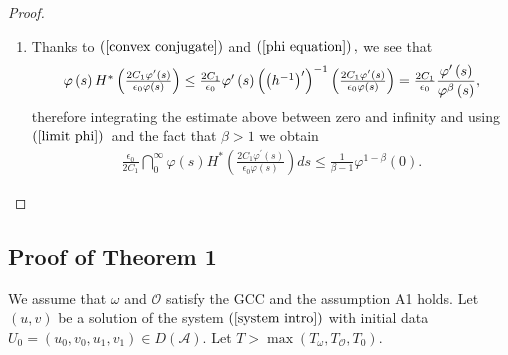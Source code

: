 \documentclass[11pt,reqno]{amsart}
\theoremstyle{plain}
\numberwithin{equation}{section}
\numberwithin{equation}{section}
\begin{document}
\begin{proof}
\begin{enumerate}
\item Thanks to $\left( \ref{convex conjugate}\right) $ and $\left( \ref{phi
equation}\right) ,$ we see that%
\begin{equation*}
\begin{array}{c}
\varphi \left( s\right) H^{\ast }\left( \frac{2C_{1}\varphi ^{\prime }\left(
s\right) }{\epsilon _{0}\varphi \left( s\right) }\right) \leq \frac{2C_{1}}{%
\epsilon _{0}}\varphi ^{\prime }\left( s\right) \left( \left( h^{-1}\right)
^{\prime }\right) ^{-1}\left( \frac{2C_{1}\varphi ^{\prime }\left( s\right) 
}{\epsilon _{0}\varphi \left( s\right) }\right) =\frac{2C_{1}}{\epsilon _{0}}%
\dfrac{\varphi ^{\prime }\left( s\right) }{\varphi ^{\beta }\left( s\right) }%
,%
\end{array}%
\end{equation*}%
therefore integrating the estimate above between zero and infinity and using 
$\left( \ref{limit phi}\right) $\ and the fact that $\beta >1$ we obtain 
\begin{equation*}
\begin{array}{c}
\frac{\epsilon _{0}}{2C_{1}}\dint_{0}^{\infty }\varphi \left( s\right)
H^{\ast }\left( \frac{2C_{1}\varphi ^{\prime }\left( s\right) }{\epsilon
_{0}\varphi \left( s\right) }\right) ds\leq \frac{1}{\beta -1}\varphi
^{1-\beta }\left( 0\right) .%
\end{array}%
\end{equation*}
\end{enumerate}
\end{proof}

\subsection{Proof of Theorem 1}

We assume that $\omega $ and $\mathcal{O}$ satisfy the GCC and the
assumption A1 holds$.$ Let $\left( u,v\right) $ be a solution of the system $%
\left( \ref{system intro}\right) $ with initial data $U_{0}=\left(
u_{0},v_{0},u_{1},v_{1}\right) \in D\left( \mathcal{A}\right) .$ Let $T>\max
\left( T_{\omega },T_{\mathcal{O}},T_{0}\right) .$
\end{document}
